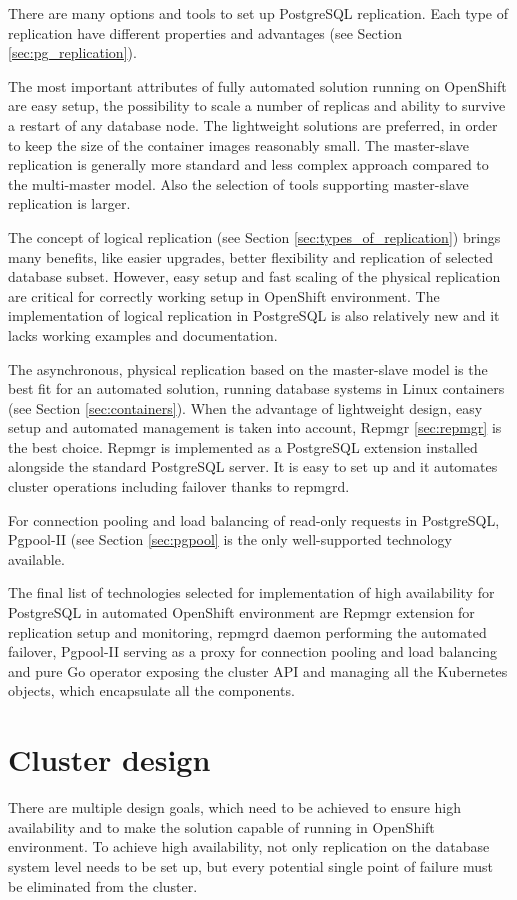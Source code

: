 \documentclass[
  digital, %
  twoside, %
  table,   %
  nolof,   %
  nolot,   %
]{fithesis3}
\begin{document}
There are many options and tools to set up PostgreSQL replication. Each type of replication have different properties and advantages (see Section \ref{sec:pg_replication}).

The most important attributes of fully automated solution running on OpenShift are easy setup, the possibility to scale a number of replicas and ability to survive a restart of any database node. The lightweight solutions are preferred, in order to keep the size of the container images reasonably small. The master-slave replication is generally more standard and less complex approach compared to the multi-master model. Also the selection of tools supporting master-slave replication is larger.

The concept of logical replication (see Section \ref{sec:types_of_replication}) brings many benefits, like easier upgrades, better flexibility and replication of selected database subset. However, easy setup and fast scaling of the physical replication are critical for correctly working setup in OpenShift environment. The implementation of logical replication in PostgreSQL is also relatively new and it lacks working examples and documentation.

The asynchronous, physical replication based on the master-slave model is the best fit for an automated solution, running database systems in Linux containers (see Section \ref{sec:containers}). When the advantage of lightweight design, easy setup and automated management is taken into account,  Repmgr \ref{sec:repmgr} is the best choice. Repmgr is implemented as a PostgreSQL extension installed alongside the standard PostgreSQL server. It is easy to set up and it automates cluster operations including failover thanks to repmgrd.

For connection pooling and load balancing of read-only requests in PostgreSQL, Pgpool-II (see Section \ref{sec:pgpool} is the only well-supported technology available.

The final list of technologies selected for implementation of high availability for PostgreSQL in automated OpenShift environment are Repmgr extension for replication setup and monitoring, repmgrd daemon performing the automated failover, Pgpool-II serving as a proxy for connection pooling and load balancing and pure Go operator exposing the cluster API and managing all the Kubernetes objects, which encapsulate all the components.

\section{Cluster design}
There are multiple design goals, which need to be achieved to ensure high availability and to make the solution capable of running in OpenShift environment. To achieve high availability, not only replication on the database system level needs to be set up, but every potential single point of failure must be eliminated from the cluster.
\end{document}
